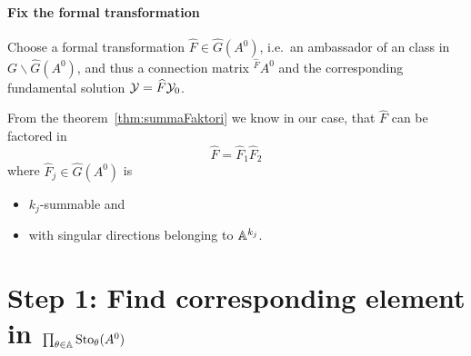 \begin{comment}
  \begin{rem}
    The matrix
    \[
      \bar\cY_0:=
      \begin{pmatrix}
        t^{L_{1,1}}e^{q_1(t^{-1})} & 0 & 0 &\cdots
      \\t^{L_{2,2}}e^{q_2(t^{-1})} & t^{L_{2,2}}e^{q_2(t^{-1})} & 0 & \cdots
      \\\vdots & & \ddots
      \\t^{L_{n,n}}e^{q_n(t^{-1})} & \cdots&\cdots & t^{L_{n,n}}e^{q_n(t^{-1})}
      \end{pmatrix}
    \]
    is also a fundamental solution.
    In fact is every matrix $\cY_0\cdot B$ with $B\in\G$ another fundamental
    solution.
  \end{rem}
\end{comment}

\paragraph{Fix the formal transformation}
Choose a formal transformation $\hat F\in\hat G(A^0)$, i.e.\ an ambassador of
an class in $G\backslash\hat G(A^0)$, and thus a connection matrix
${}^{\hat F}\!A^0$ and the corresponding fundamental solution
$\mathcal{Y}=\widehat F\mathcal{Y}_0$.

From the theorem~\ref{thm:summaFaktori} we know in our case, that $\hat F$ can
be factored in
\[
  \hat F=\hat F_1 \hat F_2
\]
where $\hat F_j\in\hat G(A^0)$ is
\begin{itemize}
  \item $k_j$-summable and
  \item with singular directions belonging to $\mathbb{A}^{k_j}$.
\end{itemize}

\section{Step 1: Find corresponding element in
  $\prod_{\theta\in\mathbb{A}}\operatorname{Sto}_\theta(A^0)$}
\begin{comment}
  needs \textbf{summability}?
  \begin{itemize}
    \item \cite[9]{thboalch} (only mentions multisummability)
    \item \cite[III.2]{Loday1994}
    \item \cite{Loday2014}
  \end{itemize}
\end{comment}

